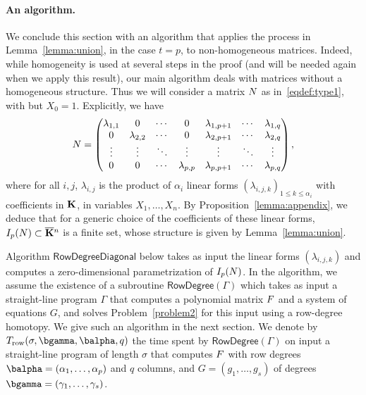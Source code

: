 \documentclass[12pt]{article}
\begin{document}
\paragraph{An algorithm.}
We conclude this section with an algorithm that applies the process
in Lemma~\ref{lemma:union}, in the case $t=p$, to non-homogeneous 
matrices. Indeed, while homogeneity is used at several steps in 
the proof (and will be needed again when we apply this result), our 
main algorithm deals with matrices without a homogeneous structure.
Thus we will consider a matrix ${N}$ as in~\eqref{eqdef:type1},
with but $X_0=1$. Explicitly, we have
\begin{align}\label{eqdef:type1aff}
{N}= \left( \begin{matrix}
\lambda_{1,1} & 0 & \cdots & 0 & \lambda_{1,p+1} & \cdots & \lambda_{1, q}\\
0 & \lambda_{2,2} & \cdots & 0 & \lambda_{2,p+1} & \cdots & \lambda_{2, q}\\
\vdots & \vdots & \ddots & \vdots & \vdots & \ddots & \vdots\\
0 & 0 & \cdots & \lambda_{p,p} & \lambda_{p,p+1} & \cdots & \lambda_{p, q}
\end{matrix} \right),
\end{align}
where for all $i,j$, $\lambda_{i,j}$ is the product of $\alpha_i$
linear forms $(\lambda_{i,j,k})_{1 \le k \le \alpha_i}$ with
coefficients in $\mathbf{K}$, in variables $X_1,\dots,X_n$.  By
Proposition~\ref{lemma:appendix}, we deduce that for a generic choice
of the coefficients of these linear forms, $I_p({N}) \subset
\overline{\mathbf{K}}{}^n$ is a finite set, whose structure is given by
Lemma~\ref{lemma:union}.

Algorithm $\mathsf{RowDegreeDiagonal}$ below takes as input the linear
forms $(\lambda_{i,j,k})$ and computes a zero-dimensional
parametrization of $I_p({N})$. In the algorithm, we assume the
existence of a subroutine $\mathsf{RowDegree}(\Gamma)$ which takes as
input a straight-line program $\Gamma$ that computes a polynomial
matrix ${F}$ and a system of equations $G$, and solves
Problem~\ref{problem2} for this input using a row-degree homotopy. We
give such an algorithm in the next section. We denote by $T_{\rm
  row}(\sigma,\bgamma,\balpha,q)$ the time spent by
$\mathsf{RowDegree}(\Gamma)$ on input a straight-line program of
length $\sigma$ that computes ${F}$ with row degrees
$\balpha=(\alpha_1,\dots,\alpha_p)$ and $q$ columns, and
$G=(g_1,\dots,g_s)$ of degrees $\bgamma=(\gamma_1,\dots,\gamma_s)$.
\end{document}
